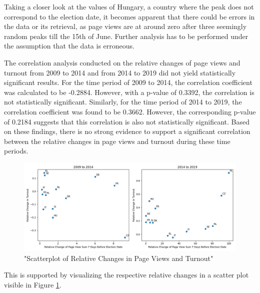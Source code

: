Taking a closer look at the values of Hungary, a country  where the peak does not correspond to the election date, it becomes apparent that there could be errors in the data or its retrieval, as page views are at around zero after three seemingly random peaks till the 15th of June. Further analysis has to be performed under the assumption that the data is erroneous.

The correlation analysis conducted on the relative changes of page views and turnout from 2009 to 2014 and from 2014 to 2019 did not yield statistically significant results. For the time period of 2009 to 2014, the correlation coefficient was calculated to be -0.2884. However, with a p-value of 0.3392, the correlation is not statistically significant. Similarly, for the time period of 2014 to 2019, the correlation coefficient was found to be 0.3662. However, the corresponding p-value of 0.2184 suggests that this correlation is also not statistically significant. Based on these findings, there is no strong evidence to support a significant correlation between the relative changes in page views and turnout during these time periods.

\begin{figure}[]
    \centering
    \includegraphics[width=\textwidth]{fig/scatter.png}
    \caption{"Scatterplot of Relative Changes in Page Views and Turnout"}
    \label{fig:figure4}
\end{figure}

This is supported by visualizing the respective relative changes in a scatter plot visible in Figure \ref{fig:figure4}.
